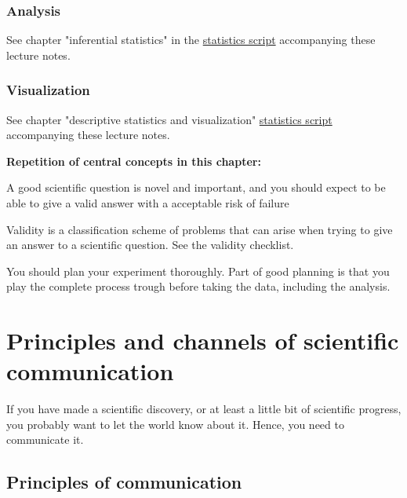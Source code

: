 \documentclass{tufte-book}
\begin{document}
\subsection{Analysis}

See chapter "inferential statistics" in the \href{https://github.com/florianhartig/ResearchSkills/raw/master/Labs/Statistics/Script/EssentialStatistics.pdf}{statistics script} accompanying these lecture notes.


\subsection{Visualization}

See chapter "descriptive statistics and visualization" \href{https://github.com/florianhartig/ResearchSkills/raw/master/Labs/Statistics/Script/EssentialStatistics.pdf}{statistics script} accompanying these lecture notes.


\vspace{1cm}
\begin{mdframed}
    
\textbf{Repetition of central concepts in this chapter:} 

\begin{itemize*}
  \item A good scientific question is novel and important, and you should expect to be able to give a valid answer with a acceptable risk of failure
  \item Validity is a classification scheme of problems that can arise when trying to give an answer to a scientific question. See the validity checklist.
  \item You should plan your experiment thoroughly. Part of good planning is that you play the complete process trough before taking the data, including the analysis.
\end{itemize*}

\end{mdframed}



\chapter{Principles and channels of scientific communication}

If you have made a scientific discovery, or at least a little bit of scientific progress, you probably want to let the world know about it. Hence, you need to communicate it.

\section{Principles of communication}
\end{document}

